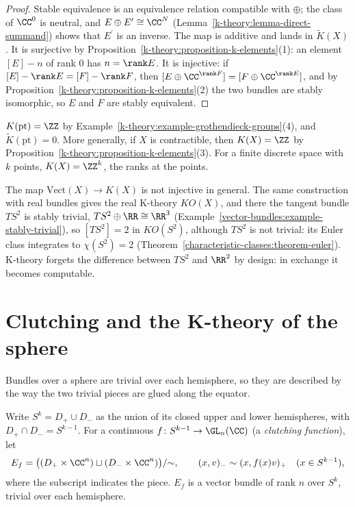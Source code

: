 \begin{proof}
Stable equivalence is an equivalence relation compatible with $\oplus$; the class of $\CC^0$ is neutral, and $E \oplus E^{\prime} \cong \CC^N$ (Lemma~\ref{k-theory:lemma-direct-summand}) shows that $E^{\prime}$ is an
inverse. The map is additive and lands in $\tilde{K}(X)$. It is surjective by Proposition~\ref{k-theory:proposition-k-elements}(1): an element $[E] - n$ of rank $0$ has $n = \rank E$. It is injective: if
$[E] - \rank E = [F] - \rank F$, then $[E \oplus \CC^{\rank F}] = [F \oplus \CC^{\rank E}]$, and by Proposition~\ref{k-theory:proposition-k-elements}(2) the two bundles are stably isomorphic, so $E$ and $F$
are stably equivalent.
\end{proof}

\begin{example}\label{k-theory:example-k-point}
$K(\mathrm{pt}) = \ZZ$ by Example~\ref{k-theory:example-grothendieck-groups}(4), and $\tilde{K}(\mathrm{pt}) = 0$. More generally, if $X$ is contractible, then $K(X) = \ZZ$ by
Proposition~\ref{k-theory:proposition-k-elements}(3). For a finite discrete space with $k$ points, $K(X) = \ZZ^k$, the ranks at the points.
\end{example}

\begin{counterexample}\label{k-theory:counterexample-stably-trivial}
The map $\mathrm{Vect}(X) \to K(X)$ is not injective in general. The same construction with real bundles gives the real K-theory $KO(X)$, and there the tangent bundle $TS^2$ is stably trivial,
$TS^2 \oplus \RR \cong \RR^3$ (Example~\ref{vector-bundles:example-stably-trivial}), so $[TS^2] = 2$ in $KO(S^2)$, although $TS^2$ is not trivial: its Euler class integrates to $\chi(S^2) = 2$
(Theorem~\ref{characteristic-classes:theorem-euler}). K-theory forgets the difference between $TS^2$ and $\RR^2$ by design: in exchange it becomes computable.
\end{counterexample}

\section{Clutching and the K-theory of the sphere}\label{k-theory:section-clutching}

Bundles over a sphere are trivial over each hemisphere, so they are described by the way the two trivial pieces are glued along the equator.

\begin{definition}\label{k-theory:definition-clutching}
Write $S^k = D_+ \cup D_-$ as the union of its closed upper and lower hemispheres, with $D_+ \cap D_- = S^{k-1}$. For a continuous $f \colon S^{k-1} \to \GL_n(\CC)$ (a \emph{clutching function}), let
\[
E_f = \big((D_+ \times \CC^n) \sqcup (D_- \times \CC^n)\big)/{\sim}, \qquad (x, v)_- \sim (x, f(x)v)_+ \quad (x \in S^{k-1}),
\]
where the subscript indicates the piece. $E_f$ is a vector bundle of rank $n$ over $S^k$, trivial over each hemisphere.
\end{definition}

